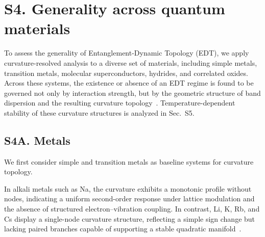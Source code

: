 \documentclass[12pt]{article}
\begin{document}



\section*{S4. Generality across quantum materials}

To assess the generality of Entanglement-Dynamic Topology (EDT), we apply curvature-resolved analysis to a diverse set of materials, including simple metals, transition metals, molecular superconductors, hydrides, and correlated oxides. Across these systems, the existence or absence of an EDT regime is found to be governed not only by interaction strength, but by the geometric structure of band dispersion and the resulting curvature topology~\cite{Kittel2004,Ziman1972,Giustino2017}. Temperature-dependent stability of these curvature structures is analyzed in Sec.~S5.

\subsection*{S4A. Metals}

We first consider simple and transition metals as baseline systems for curvature topology.

In alkali metals such as Na, the curvature exhibits a monotonic profile without nodes, indicating a uniform second-order response under lattice modulation and the absence of structured electron--vibration coupling. In contrast, Li, K, Rb, and Cs display a single-node curvature structure, reflecting a simple sign change but lacking paired branches capable of supporting a stable quadratic manifold~\cite{Kittel2004,Hu2025_APQ,Hu2026_JPCM}.
\end{document}
